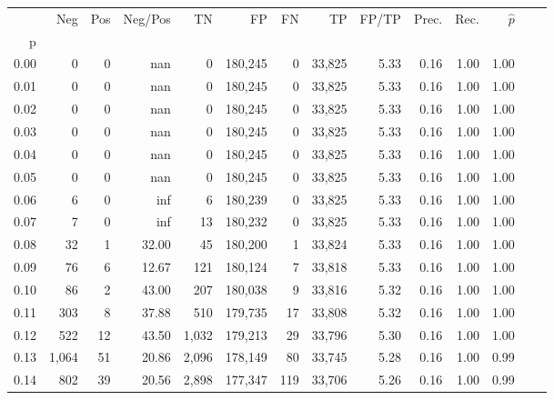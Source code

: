 \begin{tabular}{rrrrrrrrrrrrrr}
\toprule
{} &    Neg &    Pos & Neg/Pos &       TN &       FP &      FN &      TP & FP/TP & Prec. &  Rec. & $\hat{p}$ \\
p    &        &        &         &          &          &         &         &       &       &       &           \\
\midrule
0.00 &      0 &      0 &     nan &        0 &  180,245 &       0 &  33,825 &  5.33 &  0.16 &  1.00 &      1.00 \\
0.01 &      0 &      0 &     nan &        0 &  180,245 &       0 &  33,825 &  5.33 &  0.16 &  1.00 &      1.00 \\
0.02 &      0 &      0 &     nan &        0 &  180,245 &       0 &  33,825 &  5.33 &  0.16 &  1.00 &      1.00 \\
0.03 &      0 &      0 &     nan &        0 &  180,245 &       0 &  33,825 &  5.33 &  0.16 &  1.00 &      1.00 \\
0.04 &      0 &      0 &     nan &        0 &  180,245 &       0 &  33,825 &  5.33 &  0.16 &  1.00 &      1.00 \\
0.05 &      0 &      0 &     nan &        0 &  180,245 &       0 &  33,825 &  5.33 &  0.16 &  1.00 &      1.00 \\
0.06 &      6 &      0 &     inf &        6 &  180,239 &       0 &  33,825 &  5.33 &  0.16 &  1.00 &      1.00 \\
0.07 &      7 &      0 &     inf &       13 &  180,232 &       0 &  33,825 &  5.33 &  0.16 &  1.00 &      1.00 \\
0.08 &     32 &      1 &   32.00 &       45 &  180,200 &       1 &  33,824 &  5.33 &  0.16 &  1.00 &      1.00 \\
0.09 &     76 &      6 &   12.67 &      121 &  180,124 &       7 &  33,818 &  5.33 &  0.16 &  1.00 &      1.00 \\
0.10 &     86 &      2 &   43.00 &      207 &  180,038 &       9 &  33,816 &  5.32 &  0.16 &  1.00 &      1.00 \\
0.11 &    303 &      8 &   37.88 &      510 &  179,735 &      17 &  33,808 &  5.32 &  0.16 &  1.00 &      1.00 \\
0.12 &    522 &     12 &   43.50 &    1,032 &  179,213 &      29 &  33,796 &  5.30 &  0.16 &  1.00 &      1.00 \\
0.13 &  1,064 &     51 &   20.86 &    2,096 &  178,149 &      80 &  33,745 &  5.28 &  0.16 &  1.00 &      0.99 \\
0.14 &    802 &     39 &   20.56 &    2,898 &  177,347 &     119 &  33,706 &  5.26 &  0.16 &  1.00 &      0.99 \\

\end{tabular}
